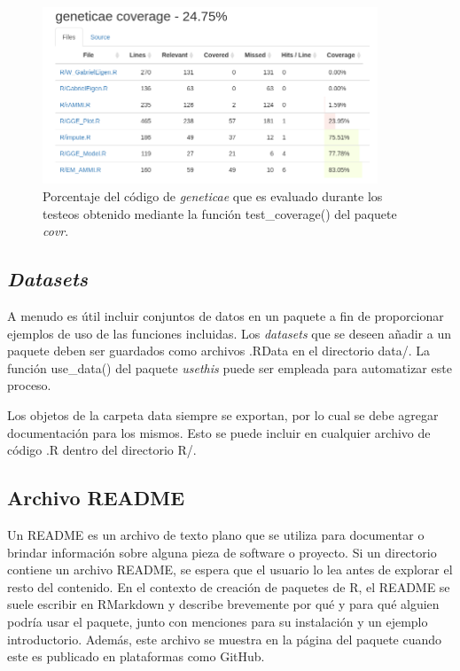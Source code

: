 \begin{figure}[H]
	\begin{center}
		\includegraphics[width=10cm]{./Graficos/Cobertura.png}	
	\end{center}
	\caption{Porcentaje del código de \emph{geneticae} que es evaluado durante los testeos obtenido mediante la función \textcolor{fandango}{test\_coverage()} del paquete \emph{covr}.}
	\label{fig:fig37}
\end{figure}


\subsection{\emph{Datasets}}

A menudo es útil incluir conjuntos de datos en un paquete a fin de proporcionar ejemplos de uso de las funciones incluidas. Los \emph{datasets} que se deseen añadir a un paquete deben ser guardados como archivos .RData en el directorio data/. La función \textcolor{fandango}{use\_data()} del paquete \emph{usethis} puede ser empleada para automatizar este proceso.

Los objetos de la carpeta data siempre se exportan, por lo cual se debe agregar documentación para los mismos. Esto se puede incluir en cualquier archivo de código .R dentro del directorio R/. 


\subsection{Archivo README}

Un README es un archivo de texto plano que se utiliza para documentar o brindar información sobre alguna pieza de software o proyecto. Si un directorio contiene un archivo README, se espera que el usuario lo lea antes de explorar el resto del contenido. En el contexto de creación de paquetes de R, el README se suele escribir en RMarkdown y describe brevemente por qué y para qué alguien podría usar el paquete, junto con menciones para su instalación y un ejemplo introductorio. Además, este archivo se muestra en la página del paquete cuando este es publicado en plataformas como GitHub. 

